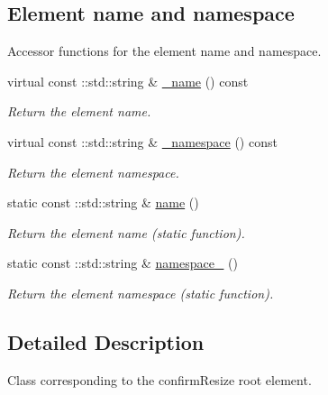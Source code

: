 \subsection*{Element name and namespace}
\label{_amgrpd4b5b61f6e07390f4af2465e04571f34}
Accessor functions for the element name and namespace. \begin{DoxyCompactItemize}
\item 
virtual const ::std::string \& \hyperlink{classopenstack_1_1xml_1_1ConfirmResize___a3dbbd100dec2ac1874fda8f025fd3aab}{\_\-name} () const 
\begin{DoxyCompactList}\small\item\em Return the element name. \item\end{DoxyCompactList}\item 
virtual const ::std::string \& \hyperlink{classopenstack_1_1xml_1_1ConfirmResize___a4a0c8ccc8750daefc8415ff96db8940c}{\_\-namespace} () const 
\begin{DoxyCompactList}\small\item\em Return the element namespace. \item\end{DoxyCompactList}\item 
static const ::std::string \& \hyperlink{classopenstack_1_1xml_1_1ConfirmResize___a302959113f8403ce35f0d162611beb39}{name} ()
\begin{DoxyCompactList}\small\item\em Return the element name (static function). \item\end{DoxyCompactList}\item 
static const ::std::string \& \hyperlink{classopenstack_1_1xml_1_1ConfirmResize___a5c0bd963d48c1ed2a4f27bf78d05c29d}{namespace\_\-} ()
\begin{DoxyCompactList}\small\item\em Return the element namespace (static function). \item\end{DoxyCompactList}\end{DoxyCompactItemize}


\subsection{Detailed Description}
Class corresponding to the confirmResize root element. 

